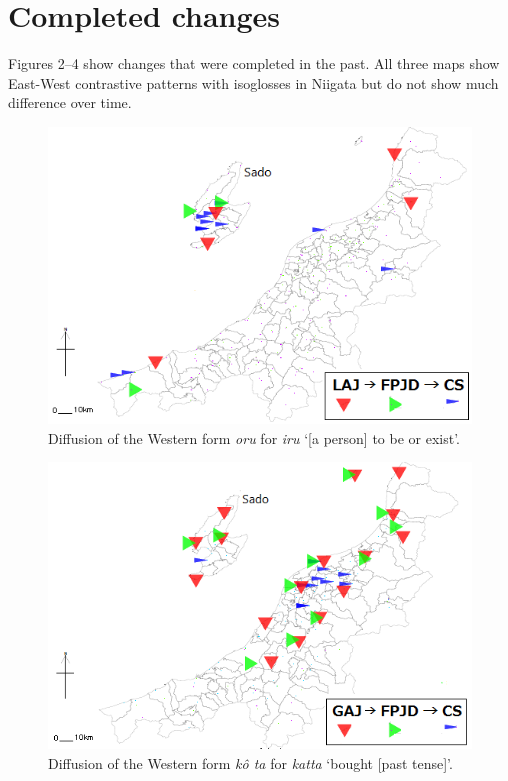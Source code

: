 \documentclass[output=paper]{LSP/langsci}
\begin{document}
\section{Completed changes}

Figures 2--4 show changes that were completed in the past.  All three maps show East-West contrastive patterns with isoglosses in Niigata but do not show much difference over time.

\begin{figure}
\includegraphics[width=.75\textwidth]{illustrations/fuku2_fig2a}
\caption{Diffusion of the Western form \textit{oru} for \textit{iru} `[a person] to be or exist'.}
\label{fig:2a}
\end{figure}

\begin{figure}
\includegraphics[width=.75\textwidth]{illustrations/fuku2_fig2b}
\caption{Diffusion of the Western form \textit{k\^{o}
ta} for \textit{katta} `bought [past tense]'.}
\label{fig:2b}
\end{figure}
\end{document}
